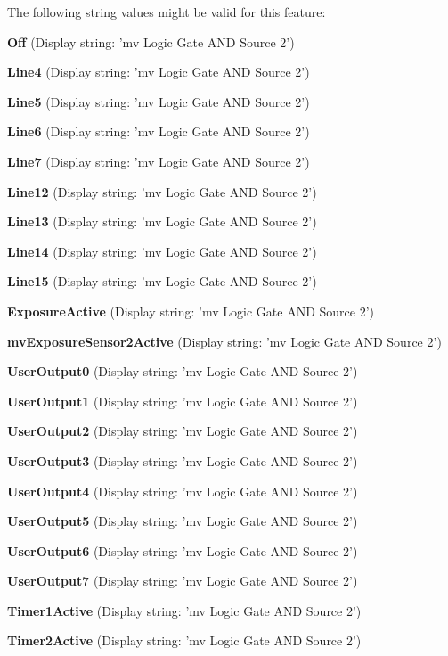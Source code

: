 The following string values might be valid for this feature\+:
\begin{DoxyItemize}
\item {\bfseries Off} (Display string\+: 'mv Logic Gate A\+N\+D Source 2')
\item {\bfseries Line4} (Display string\+: 'mv Logic Gate A\+N\+D Source 2')
\item {\bfseries Line5} (Display string\+: 'mv Logic Gate A\+N\+D Source 2')
\item {\bfseries Line6} (Display string\+: 'mv Logic Gate A\+N\+D Source 2')
\item {\bfseries Line7} (Display string\+: 'mv Logic Gate A\+N\+D Source 2')
\item {\bfseries Line12} (Display string\+: 'mv Logic Gate A\+N\+D Source 2')
\item {\bfseries Line13} (Display string\+: 'mv Logic Gate A\+N\+D Source 2')
\item {\bfseries Line14} (Display string\+: 'mv Logic Gate A\+N\+D Source 2')
\item {\bfseries Line15} (Display string\+: 'mv Logic Gate A\+N\+D Source 2')
\item {\bfseries Exposure\+Active} (Display string\+: 'mv Logic Gate A\+N\+D Source 2')
\item {\bfseries mv\+Exposure\+Sensor2\+Active} (Display string\+: 'mv Logic Gate A\+N\+D Source 2')
\item {\bfseries User\+Output0} (Display string\+: 'mv Logic Gate A\+N\+D Source 2')
\item {\bfseries User\+Output1} (Display string\+: 'mv Logic Gate A\+N\+D Source 2')
\item {\bfseries User\+Output2} (Display string\+: 'mv Logic Gate A\+N\+D Source 2')
\item {\bfseries User\+Output3} (Display string\+: 'mv Logic Gate A\+N\+D Source 2')
\item {\bfseries User\+Output4} (Display string\+: 'mv Logic Gate A\+N\+D Source 2')
\item {\bfseries User\+Output5} (Display string\+: 'mv Logic Gate A\+N\+D Source 2')
\item {\bfseries User\+Output6} (Display string\+: 'mv Logic Gate A\+N\+D Source 2')
\item {\bfseries User\+Output7} (Display string\+: 'mv Logic Gate A\+N\+D Source 2')
\item {\bfseries Timer1\+Active} (Display string\+: 'mv Logic Gate A\+N\+D Source 2')
\item {\bfseries Timer2\+Active} (Display string\+: 'mv Logic Gate A\+N\+D Source 2')

\end{DoxyItemize}
